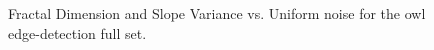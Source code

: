 \documentclass[12pt, oneside]{book}
\begin{document}
\begin{figure}[!b]
  \centering
  \caption[Fractal Dimension and Slope Variance vs. Uniform noise for the owl edge-detection full set]{Fractal Dimension and Slope Variance vs. Uniform noise for the owl edge-detection full set.}
  \label{fig:owl-ed2_multi_uniform_result}
\end{figure}
\end{document}
